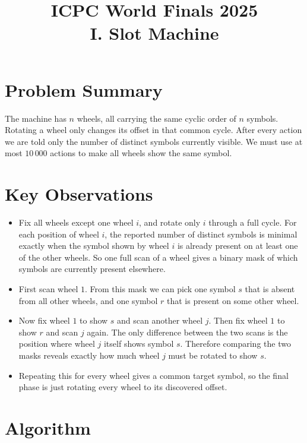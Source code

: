 \documentclass[11pt]{article}
\title{ICPC World Finals 2025\\I. Slot Machine}
\author{}
\date{}
\begin{document}
\maketitle

\section*{Problem Summary}

The machine has $n$ wheels, all carrying the same cyclic order of $n$ symbols. Rotating a wheel only
changes its offset in that common cycle. After every action we are told only the number of distinct
symbols currently visible. We must use at most $10\,000$ actions to make all wheels show the same
symbol.

\section*{Key Observations}

\begin{itemize}[leftmargin=*]
    \item Fix all wheels except one wheel $i$, and rotate only $i$ through a full cycle. For each position of
    wheel $i$, the reported number of distinct symbols is minimal exactly when the symbol shown by
    wheel $i$ is already present on at least one of the other wheels. So one full scan of a wheel gives a
    binary mask of which symbols are currently present elsewhere.
    \item First scan wheel $1$. From this mask we can pick one symbol $s$ that is absent from all other
    wheels, and one symbol $r$ that is present on some other wheel.
    \item Now fix wheel $1$ to show $s$ and scan another wheel $j$. Then fix wheel $1$ to show $r$ and
    scan $j$ again. The only difference between the two scans is the position where wheel $j$ itself
    shows symbol $s$. Therefore comparing the two masks reveals exactly how much wheel $j$ must be
    rotated to show $s$.
    \item Repeating this for every wheel gives a common target symbol, so the final phase is just rotating
    every wheel to its discovered offset.
\end{itemize}

\section*{Algorithm}
\end{document}
